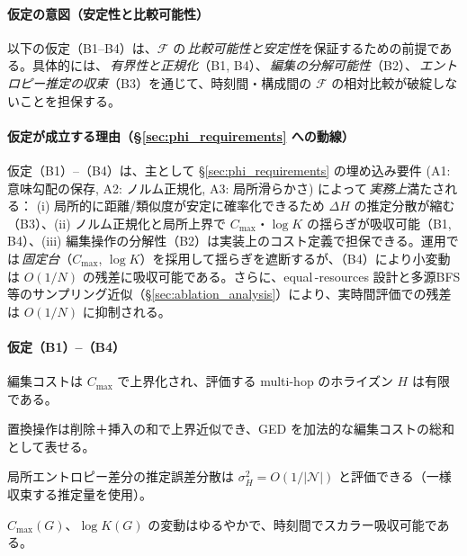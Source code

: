\documentclass[ja=standard,xelatex]{bxjsarticle}
\newcommand{\F}{\mathcal{F}}
\begin{document}
\paragraph{仮定の意図（安定性と比較可能性）}\; 以下の仮定（B1–B4）は、$\F$ の\,\emph{比較可能性と安定性}を保証するための前提である。具体的には、\,\emph{有界性と正規化}（B1, B4）、\,\emph{編集の分解可能性}（B2）、\,\emph{エントロピー推定の収束}（B3）を通じて、時刻間・構成間の $\F$ の相対比較が破綻しないことを担保する。

\paragraph{仮定が成立する理由（\S\ref{sec:phi_requirements} への動線）}
仮定（B1）–（B4）は、主として \S\ref{sec:phi_requirements} の埋め込み要件 (A1: 意味勾配の保存, A2: ノルム正規化, A3: 局所滑らかさ) によって\,\emph{実務上}満たされる： (i) 局所的に距離/類似度が安定に確率化できるため $\Delta H$ の推定分散が縮む（B3）、(ii) ノルム正規化と局所上界で $C_{\max}$・$\log K$ の揺らぎが吸収可能（B1, B4）、(iii) 編集操作の分解性（B2）は実装上のコスト定義で担保できる。運用では\,\emph{固定台}（$C_{\max}$, $\log K$）を採用して揺らぎを遮断するが、（B4）により小変動は $O(1/N)$ の残差に吸収可能である。さらに、equal\,\mbox{-}resources 設計と多源BFS等のサンプリング近似（\S\ref{sec:ablation_analysis}）により、実時間評価での残差は $O(1/N)$ に抑制される。

\paragraph{仮定（B1）–（B4）}
\begin{description}[leftmargin=1.8em]
  \item[(B1) 局所有界性] 編集コストは $C_{\max}$ で上界化され、評価する multi-hop のホライズン $H$ は有限である。
  \item[(B2) 編集分解] 置換操作は削除＋挿入の和で上界近似でき、GED を加法的な編集コストの総和として表せる。
  \item[(B3) エントロピー推定] 局所エントロピー差分の推定誤差分散は $\sigma_H^2=O(1/|\mathcal{N}|)$ と評価できる（一様収束する推定量を使用）。
  \item[(B4) 正規化安定性] $C_{\max}(G)$、$\log K(G)$ の変動はゆるやかで、時刻間でスカラー吸収可能である。
\end{description}
\end{document}
